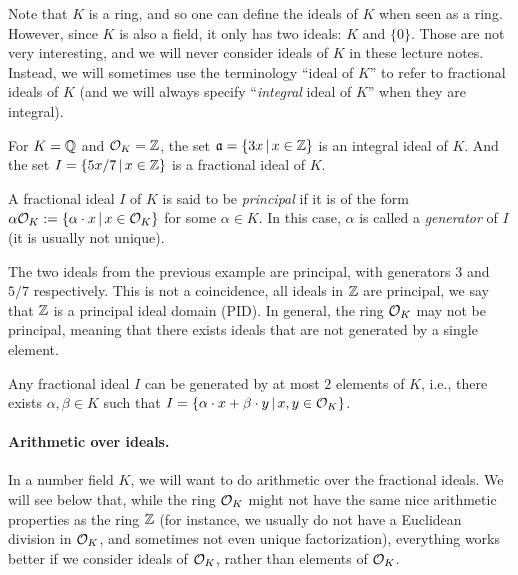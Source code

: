Note that $K$ is a ring, and so one can define the ideals of $K$ when seen as a ring. However, since $K$ is also a field, it only has two ideals: $K$ and $\{0\}$. Those are not very interesting, and we will never consider ideals of $K$ in these lecture notes. Instead, we will sometimes use the terminology ``ideal of $K$'' to refer to fractional ideals of $K$ (and we will always specify ``\emph{integral} ideal of $K$'' when they are integral).

\begin{example}
For $K = \mathbb{Q}$ and $\mathcal{O}_K = \mathbb{Z}$, the set $\mathfrak{a} = \{3x\,|\, x \in \mathbb{Z}\}$ is an integral ideal of $K$. And the set $I = \{5x/7 \,|\, x \in \mathbb{Z}\}$ is a fractional ideal of $K$.
\end{example}

\begin{definition}
A fractional ideal $I$ of $K$ is said to be \emph{principal} if it is of the form $\alpha \mathcal{O}_K := \{ \alpha \cdot x\,|\, x \in \mathcal{O}_K\}$ for some $\alpha \in K$. In this case, $\alpha$ is called a \emph{generator} of $I$ (it is usually not unique).
\end{definition}

\begin{example}
The two ideals from the previous example are principal, with generators $3$ and $5/7$ respectively. This is not a coincidence, all ideals in $\mathbb{Z}$ are principal, we say that $\mathbb{Z}$ is a principal ideal domain (PID).
In general, the ring $\mathcal{O}_K$ may not be principal, meaning that there exists ideals that are not generated by a single element.
\end{example}

\begin{lemma}
\label{lemma:two-elm-rep}
Any fractional ideal $I$ can be generated by at most $2$ elements of $K$, i.e., there exists $\alpha, \beta \in K$ such that $I = \{ \alpha \cdot x + \beta \cdot y \,|\, x, y \in \mathcal{O}_K\}$.
\end{lemma}

\paragraph{Arithmetic over ideals.} In a number field $K$, we will want to do arithmetic over the fractional ideals. We will see below that, while the ring $\mathcal{O}_K$ might not have the same nice arithmetic properties as the ring $\mathbb{Z}$ (for instance, we usually do not have a Euclidean division in $\mathcal{O}_K$, and sometimes not even unique factorization), everything works better if we consider ideals of $\mathcal{O}_K$, rather than elements of $\mathcal{O}_K$.


